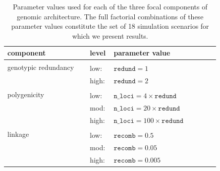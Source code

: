 \documentclass[9pt,twocolumn,twoside,lineno]{new_article}
\begin{document}
\begin{table}
\begin{tabular}{b{0.35\linewidth}b{0.05\linewidth}b{0.45\linewidth}}
\hline
\textbf{component} & \textbf{level} & \textbf{parameter value} \\
\hline
\multirow{2}{10em}{genotypic redundancy} \\
& low: & $\texttt{redund}=1$ \\
& high: & $\texttt{redund}=2$ \\
\hline
\multirow{2}{10em}{polygenicity} \\
& low: & $\texttt{n\_loci}=4\times \texttt{redund}$ \\ 
& mod: & $\texttt{n\_loci}=20\times \texttt{redund}$ \\
& high: & $\texttt{n\_loci}=100\times \texttt{redund}$ \\
\hline
\multirow{2}{10em}{linkage} \\
& low: & $\texttt{recomb}=0.5$ \\
& mod: & $\texttt{recomb}=0.05$ \\
& high: & $\texttt{recomb}=0.005$ \\
\hline
\end{tabular}
\medskip
\caption{\label{tab:tab_1}Parameter values used for each of the three focal components of genomic architecture. The full factorial combinations of these parameter values constitute the set of 18 simulation scenarios for which we present results.}
\end{table}
\end{document}
